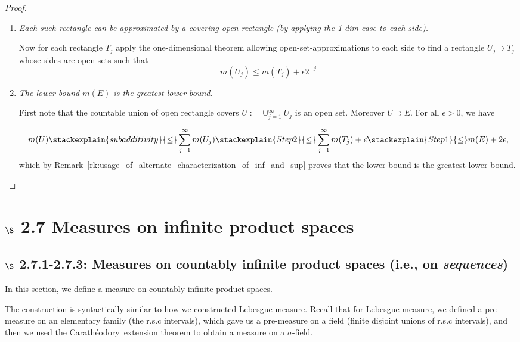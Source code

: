 \documentclass{article} %
\newcommand{\Caratheodory}{Carath\'eodory}
\begin{document}
\begin{proof}
\begin{enumerate}
\item \textit{Each such rectangle can be approximated by a covering open rectangle (by applying the 1-dim case to each side).}
 
 Now for each rectangle $T_j$ apply the one-dimensional theorem allowing open-set-approximations \cite[Thm~1.18]{folland1999real} to each side to find a rectangle $U_j \supset T_j$ whose sides are open sets such that  
 \[ m(U_j) \leq m(T_j) + \epsilon 2^{-j} \]

\item \textit{The lower bound $m(E)$ is the greatest lower bound.}

First note that the countable union of open rectangle covers $U := \cup_{j=1}^\infty U_j$ is an open set.  Moreover $U \supset E$.  For all $\epsilon>0$, we have 

\begin{align*}
m(U) \stackexplain{subadditivity}{\leq} \sum_{j=1}^\infty m(U_j) \stackexplain{Step 2}{\leq} \sum_{j=1}^\infty m(T_j) + \epsilon  \stackexplain{Step 1}{\leq} m(E) + 2\epsilon,
\end{align*} 
which by Remark~\ref{rk:usage_of_alternate_characterization_of_inf_and_sup} proves that the lower bound is the greatest lower bound. 
\end{enumerate}
	
\end{proof}




\section{$\S$ 2.7 Measures on infinite product spaces}

\subsection{$\S$ 2.7.1-2.7.3: Measures on countably infinite product spaces (i.e., on \textit{sequences})}

In this section, we define a measure on countably infinite product spaces.  

The construction is syntactically similar to how we constructed Lebesgue measure.   Recall that for Lebesgue measure, we defined a pre-measure on an elementary family (the r.s.c intervals), which gave us a pre-measure on a field (finite disjoint unions of r.s.c intervals), and then we used the \Caratheodory~extension theorem to obtain a measure on a $\sigma$-field.  
\end{document}
